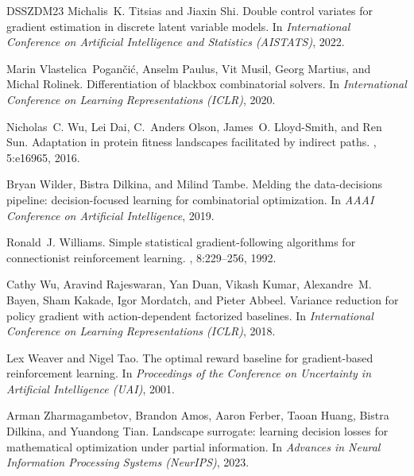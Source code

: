\documentclass[10pt]{article}
\theoremstyle{plain}
\theoremstyle{definition}
\theoremstyle{remark}
\theoremstyle{definition}
\begin{document}
\begin{thebibliography}{DSSZDM23}
Michalis~K. Titsias and Jiaxin Shi.
\newblock Double control variates for gradient estimation in discrete latent variable models.
\newblock In {\em International Conference on Artificial Intelligence and Statistics (AISTATS)}, 2022.

Marin Vlastelica~Pogan{\v{c}}i{\'c}, Anselm Paulus, Vit Musil, Georg Martius, and Michal Rolinek.
\newblock Differentiation of blackbox combinatorial solvers.
\newblock In {\em International Conference on Learning Representations (ICLR)}, 2020.

Nicholas~C. Wu, Lei Dai, C.~Anders Olson, James~O. Lloyd-Smith, and Ren Sun.
\newblock Adaptation in protein fitness landscapes facilitated by indirect paths.
, 5:e16965, 2016.

Bryan Wilder, Bistra Dilkina, and Milind Tambe.
\newblock Melding the data-decisions pipeline: decision-focused learning for combinatorial optimization.
\newblock In {\em AAAI Conference on Artificial Intelligence}, 2019.

Ronald~J. Williams.
\newblock Simple statistical gradient-following algorithms for connectionist reinforcement learning.
, 8:229--256, 1992.

Cathy Wu, Aravind Rajeswaran, Yan Duan, Vikash Kumar, Alexandre~M. Bayen, Sham Kakade, Igor Mordatch, and Pieter Abbeel.
\newblock Variance reduction for policy gradient with action-dependent factorized baselines.
\newblock In {\em International Conference on Learning Representations (ICLR)}, 2018.

Lex Weaver and Nigel Tao.
\newblock The optimal reward baseline for gradient-based reinforcement learning.
\newblock In {\em Proceedings of the Conference on Uncertainty in Artificial Intelligence (UAI)}, 2001.

Arman Zharmagambetov, Brandon Amos, Aaron Ferber, Taoan Huang, Bistra Dilkina, and Yuandong Tian.
\newblock Landscape surrogate: learning decision losses for mathematical optimization under partial information.
\newblock In {\em Advances in Neural Information Processing Systems (NeurIPS)}, 2023.

\end{thebibliography}
\end{document}
